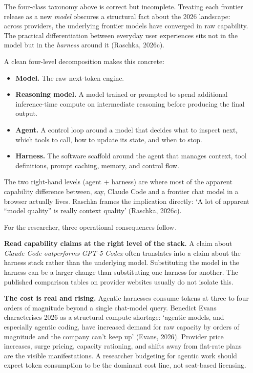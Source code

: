 \documentclass[
  letterpaper,
  11pt]{scrbook}
\providecommand{\tightlist}{%
  \setlength{\itemsep}{0pt}\setlength{\parskip}{0pt}}
\begin{document}
The four-class taxonomy above is correct but incomplete. Treating each
frontier release as a new \emph{model} obscures a structural fact about
the 2026 landscape: across providers, the underlying frontier models
have converged in raw capability. The practical differentiation between
everyday user experiences sits not in the model but in the
\emph{harness} around it (Raschka, 2026c).

A clean four-level decomposition makes this concrete:

\begin{itemize}
\tightlist
\item
  \textbf{Model.} The raw next-token engine.
\item
  \textbf{Reasoning model.} A model trained or prompted to spend
  additional inference-time compute on intermediate reasoning before
  producing the final output.
\item
  \textbf{Agent.} A control loop around a model that decides what to
  inspect next, which tools to call, how to update its state, and when
  to stop.
\item
  \textbf{Harness.} The software scaffold around the agent that manages
  context, tool definitions, prompt caching, memory, and control flow.
\end{itemize}

The two right-hand levels (agent + harness) are where most of the
apparent capability difference between, say, Claude Code and a frontier
chat model in a browser actually lives. Raschka frames the implication
directly: `A lot of apparent ``model quality'' is really context
quality' (Raschka, 2026c).

For the researcher, three operational consequences follow.

\textbf{Read capability claims at the right level of the stack.} A claim
about \emph{Claude Code outperforms GPT-5 Codex} often translates into a
claim about the harness stack rather than the underlying model.
Substituting the model in the harness can be a larger change than
substituting one harness for another. The published comparison tables on
provider websites usually do not isolate this.

\textbf{The cost is real and rising.} Agentic harnesses consume tokens
at three to four orders of magnitude beyond a single chat-model query.
Benedict Evans characterises 2026 as a structural compute shortage:
`agentic models, and especially agentic coding, have increased demand
for raw capacity by orders of magnitude and the company can't keep up'
(Evans, 2026). Provider price increases, surge pricing, capacity
rationing, and shifts away from flat-rate plans are the visible
manifestations. A researcher budgeting for agentic work should expect
token consumption to be the dominant cost line, not seat-based
licensing.
\end{document}
